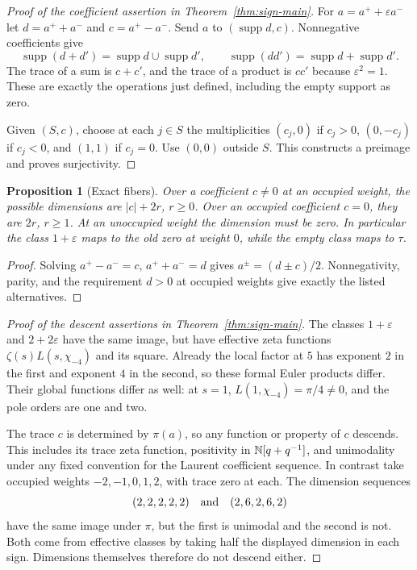 \documentclass[11pt]{article}
\newcommand{\eps}{\varepsilon}\newcommand{\supp}{\operatorname{supp}}
\newtheorem{proposition}[theorem]{Proposition}
\theoremstyle{definition}\newtheorem{definition}[theorem]{Definition}
\begin{document}
\begin{proof}[Proof of the coefficient assertion in Theorem~\ref{thm:sign-main}]
For $a=a^++\eps a^-$ let $d=a^++a^-$ and $c=a^+-a^-$. Send $a$ to $(\supp d,c)$. Nonnegative coefficients give
\[
 \supp(d+d')=\supp d\cup\supp d',\qquad
 \supp(dd')=\supp d+\supp d'.
\]
The trace of a sum is $c+c'$, and the trace of a product is $cc'$ because $\eps^2=1$. These are exactly the operations just defined, including the empty support as zero.

Given $(S,c)$, choose at each $j\in S$ the multiplicities $(c_j,0)$ if $c_j>0$, $(0,-c_j)$ if $c_j<0$, and $(1,1)$ if $c_j=0$. Use $(0,0)$ outside $S$. This constructs a preimage and proves surjectivity.
\end{proof}

\begin{proposition}[Exact fibers]\label{prop:fibers}
Over a coefficient $c\ne0$ at an occupied weight, the possible dimensions are $|c|+2r$, $r\ge0$. Over an occupied coefficient $c=0$, they are $2r$, $r\ge1$. At an unoccupied weight the dimension must be zero. In particular the class $1+\eps$ maps to the old zero at weight $0$, while the empty class maps to $\tau$.
\end{proposition}
\begin{proof}
Solving $a^+-a^-=c$, $a^++a^-=d$ gives $a^\pm=(d\pm c)/2$. Nonnegativity, parity, and the requirement $d>0$ at occupied weights give exactly the listed alternatives.
\end{proof}

\begin{proof}[Proof of the descent assertions in Theorem~\ref{thm:sign-main}]
The classes $1+\eps$ and $2+2\eps$ have the same image, but have effective zeta functions $\zeta(s)L(s,\chi_{-4})$ and its square. Already the local factor at $5$ has exponent $2$ in the first and exponent $4$ in the second, so these formal Euler products differ. Their global functions differ as well: at $s=1$, $L(1,\chi_{-4})=\pi/4\ne0$, and the pole orders are one and two.

The trace $c$ is determined by $\pi(a)$, so any function or property of $c$ descends. This includes its trace zeta function, positivity in $\mathbb N[q+q^{-1}]$, and unimodality under any fixed convention for the Laurent coefficient sequence. In contrast take occupied weights $-2,-1,0,1,2$, with trace zero at each. The dimension sequences
\[
 (2,2,2,2,2)\quad\hbox{and}\quad(2,6,2,6,2)
\]
have the same image under $\pi$, but the first is unimodal and the second is not. Both come from effective classes by taking half the displayed dimension in each sign. Dimensions themselves therefore do not descend either.
\end{proof}
\end{document}
